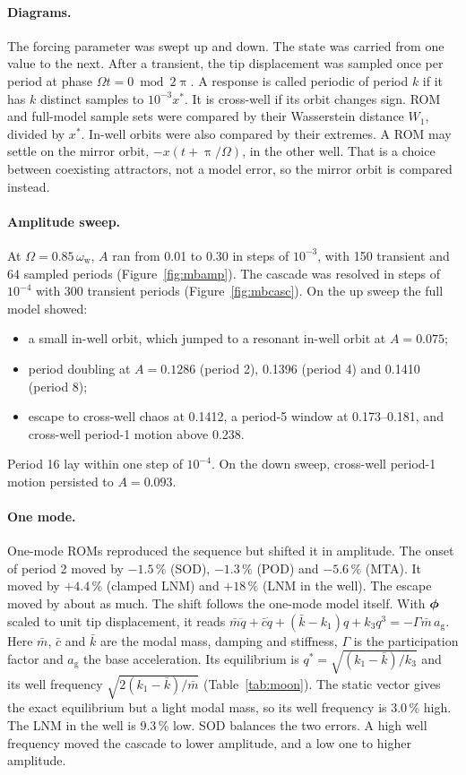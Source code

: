\documentclass[preprint,12pt]{elsarticle}
\begin{document}
\paragraph{Diagrams.} The forcing parameter was swept up and down. The state was carried from one value to the next. After a transient, the tip displacement was sampled once per period at phase $\varOmega t=0 \bmod 2\uppi$. A response is called periodic of period $k$ if it has $k$ distinct samples to $10^{-3}x^*$. It is cross-well if its orbit changes sign. ROM and full-model sample sets were compared by their Wasserstein distance $W_1$, divided by $x^*$. In-well orbits were also compared by their extremes. A ROM may settle on the mirror orbit, $-x(t+\uppi/\varOmega)$, in the other well. That is a choice between coexisting attractors, not a model error, so the mirror orbit is compared instead.

\paragraph{Amplitude sweep.} At $\varOmega=0.85\,\omega_{\mathrm w}$, $A$ ran from 0.01 to 0.30 in steps of $10^{-3}$, with 150 transient and 64 sampled periods (Figure~\ref{fig:mbamp}). The cascade was resolved in steps of $10^{-4}$ with 300 transient periods (Figure~\ref{fig:mbcasc}). On the up sweep the full model showed:
\begin{itemize}
\item a small in-well orbit, which jumped to a resonant in-well orbit at $A=0.075$;
\item period doubling at $A=0.1286$ (period 2), 0.1396 (period 4) and 0.1410 (period 8);
\item escape to cross-well chaos at 0.1412, a period-5 window at 0.173--0.181, and cross-well period-1 motion above 0.238.
\end{itemize}
Period 16 lay within one step of $10^{-4}$. On the down sweep, cross-well period-1 motion persisted to $A=0.093$.

\paragraph{One mode.} One-mode ROMs reproduced the sequence but shifted it in amplitude. The onset of period 2 moved by $-1.5\,\%$ (SOD), $-1.3\,\%$ (POD) and $-5.6\,\%$ (MTA). It moved by $+4.4\,\%$ (clamped LNM) and $+18\,\%$ (LNM in the well). The escape moved by about as much. The shift follows the one-mode model itself. With $\bm{\phi}$ scaled to unit tip displacement, it reads $\bar m\ddot q+\bar c\dot q+(\bar k-k_1)q+k_3q^3=-\varGamma\bar m\,a_{\mathrm g}$. Here $\bar m$, $\bar c$ and $\bar k$ are the modal mass, damping and stiffness, $\varGamma$ is the participation factor and $a_{\mathrm g}$ the base acceleration. Its equilibrium is $q^*=\sqrt{(k_1-\bar k)/k_3}$ and its well frequency $\sqrt{2(k_1-\bar k)/\bar m}$ (Table~\ref{tab:moon}). The static vector gives the exact equilibrium but a light modal mass, so its well frequency is 3.0\,\% high. The LNM in the well is 9.3\,\% low. SOD balances the two errors. A high well frequency moved the cascade to lower amplitude, and a low one to higher amplitude.
\end{document}
